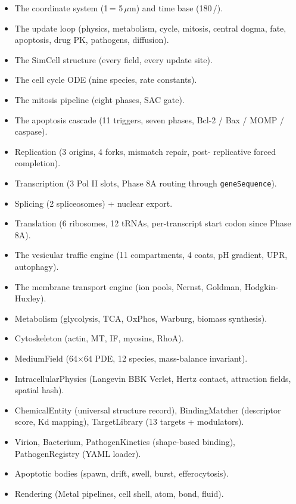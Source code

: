 \documentclass[11pt,letterpaper,twoside,openany]{book}
\newcommand{\code}[1]{\texttt{#1}}
\newcommand{\biosec}{\text{bio-s}}
\newcommand{\realsec}{\text{real-s}}
\newcommand{\wu}{\text{wu}}
\newcommand{\um}{\ensuremath{\mu\text{m}}}
\begin{document}
\begin{itemize}
  \item The coordinate system (1\,\wu = 5\,\um) and time base
        (180\,\biosec/\realsec).
  \item The update loop (physics, metabolism, cycle, mitosis,
        central dogma, fate, apoptosis, drug PK, pathogens,
        diffusion).
  \item The SimCell structure (every field, every update site).
  \item The cell cycle ODE (nine species, rate constants).
  \item The mitosis pipeline (eight phases, SAC gate).
  \item The apoptosis cascade (11 triggers, seven phases, Bcl-2
        / Bax / MOMP / caspase).
  \item Replication (3 origins, 4 forks, mismatch repair, post-
        replicative forced completion).
  \item Transcription (3 Pol II slots, Phase 8A routing through
        \code{geneSequence}).
  \item Splicing (2 spliceosomes) + nuclear export.
  \item Translation (6 ribosomes, 12 tRNAs, per-transcript start
        codon since Phase 8A).
  \item The vesicular traffic engine (11 compartments, 4 coats,
        pH gradient, UPR, autophagy).
  \item The membrane transport engine (ion pools, Nernst, Goldman,
        Hodgkin-Huxley).
  \item Metabolism (glycolysis, TCA, OxPhos, Warburg, biomass
        synthesis).
  \item Cytoskeleton (actin, MT, IF, myosins, RhoA).
  \item MediumField (64$\times$64 PDE, 12 species, mass-balance
        invariant).
  \item IntracellularPhysics (Langevin BBK Verlet, Hertz contact,
        attraction fields, spatial hash).
  \item ChemicalEntity (universal structure record), BindingMatcher
        (descriptor score, Kd mapping), TargetLibrary (13 targets +
        modulators).
  \item Virion, Bacterium, PathogenKinetics (shape-based binding),
        PathogenRegistry (YAML loader).
  \item Apoptotic bodies (spawn, drift, swell, burst, efferocytosis).
  \item Rendering (Metal pipelines, cell shell, atom, bond, fluid).

\end{itemize}
\end{document}
